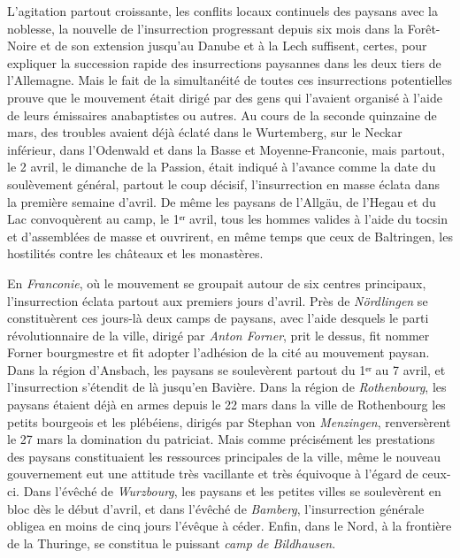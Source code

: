\documentclass[french,twoside]{book} %
\begin{document}
L’agitation partout croissante, les conflits locaux continuels des paysans avec la noblesse, la nouvelle de l’insurrection progressant depuis six mois dans la Forêt-Noire et de son extension jusqu’au Danube et à la Lech suffisent, certes, pour expliquer la succession rapide des insurrections paysannes dans les deux tiers de l’Allemagne. Mais le fait de la simultanéité de toutes ces insurrections potentielles prouve que le mouvement était dirigé par des gens qui l’avaient organisé à l’aide de leurs émissaires anabaptistes ou autres. Au cours de la seconde quinzaine de mars, des troubles avaient déjà éclaté dans le Wurtemberg, sur le Neckar inférieur, dans l’Odenwald et dans la Basse et Moyenne-Franconie, mais partout, le 2 avril, le dimanche de la Passion, était indiqué à l’avance comme la date du soulèvement général, partout le coup décisif, l’insurrection en masse éclata dans la première semaine d’avril. De même les paysans de l’Allgäu, de l’Hegau et du Lac convoquèrent au camp, le 1ᵉʳ avril, tous les hommes valides à l’aide du tocsin et d’assemblées de masse et ouvrirent, en même temps que ceux de Baltringen, les hostilités contre les châteaux et les monastères.\par
En \emph{Franconie}, où le mouvement se groupait autour de six centres principaux, l’insurrection éclata partout aux premiers jours d’avril. Près de \emph{Nördlingen} se constituèrent ces jours-là deux camps de paysans, avec l’aide desquels le parti révolutionnaire de la ville, dirigé par \emph{Anton Forner}, prit le dessus, fit nommer Forner bourgmestre et fit adopter l’adhésion de la cité au mouvement paysan. Dans la région d’Ansbach, les paysans se soulevèrent partout du 1ᵉʳ au 7 avril, et l’insurrection s’étendit de là jusqu’en Bavière. Dans la région de \emph{Rothenbourg}, les paysans étaient déjà en armes depuis le 22 mars dans la ville de Rothenbourg les petits bourgeois et les plébéiens, dirigés par Stephan von \emph{Menzingen}, renversèrent le 27 mars la domination du patriciat. Mais comme précisément les prestations des paysans constituaient les ressources principales de la ville, même le nouveau gouvernement eut une attitude très vacillante et très équivoque à l’égard de ceux-ci. Dans l’évêché de \emph{Wurzbourg}, les paysans et les petites villes se soulevèrent en bloc dès le début d’avril, et dans l’évêché de \emph{Bamberg}, l’insurrection générale obligea en moins de cinq jours l’évêque à céder. Enfin, dans le Nord, à la frontière de la Thuringe, se constitua le puissant \emph{camp de Bildhausen}.\par
\end{document}
